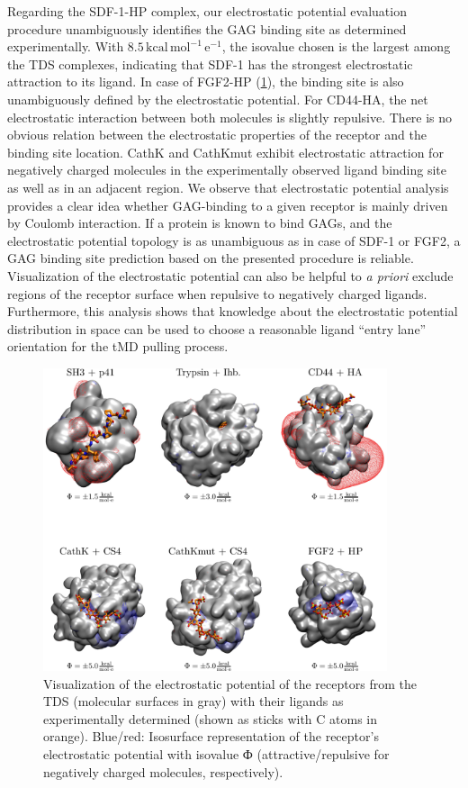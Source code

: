 Regarding the SDF-1-HP complex, our electrostatic potential evaluation procedure
unambiguously identifies the GAG binding site as determined experimentally. With
$8.5\,\mathrm{kcal\,mol^{-1}\,e^{-1}}$, the isovalue chosen is the largest among
the TDS complexes, indicating that SDF-1 has the strongest electrostatic
attraction to its ligand. In case of FGF2-HP (\cref{fig:bspred:various_estatic}), the
binding site is also unambiguously defined by the electrostatic potential. For
CD44-HA, the net electrostatic interaction between both molecules is slightly
repulsive. There is no obvious relation between the electrostatic properties of
the receptor and the binding site location. CathK and CathKmut exhibit
electrostatic attraction for negatively charged molecules in the experimentally
observed ligand binding site as well as in an adjacent region. We observe that
electrostatic potential analysis provides a clear idea whether GAG-binding to a
given receptor is mainly driven by Coulomb interaction. If a protein is known to
bind GAGs, and the electrostatic potential topology is as unambiguous as in case
of SDF-1 or FGF2, a GAG binding site prediction based on the presented procedure
is reliable. Visualization of the electrostatic potential can also be helpful to
\textit{a priori} exclude regions of the receptor surface when repulsive to
negatively charged ligands. Furthermore, this analysis shows that knowledge
about the electrostatic potential distribution in space can be used to choose a
reasonable ligand \enquote{entry lane} orientation for the tMD pulling process.


\begin{figure}
\centering
\includegraphics[width=0.9\textwidth]{gfx/bspred/suppl_figure_estatic_distributions_004_1200.png}
\caption[]{
Visualization of the electrostatic potential of the receptors from the TDS
(molecular surfaces in gray) with their ligands as experimentally determined
(shown as sticks with C atoms in orange). Blue/red: Isosurface representation of
the receptor's electrostatic potential with isovalue Ф (attractive/repulsive for
negatively charged molecules, respectively).
}
\label{fig:bspred:various_estatic}
\end{figure}


